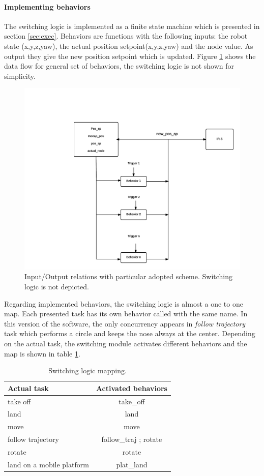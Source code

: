 \paragraph{Implementing behaviors} The switching logic is implemented as a finite state machine which is presented in section \ref{sec:exec}. Behaviors are functions with the following inputs: the robot state (x,y,z,yaw), the actual position setpoint(x,y,z,yaw) and the node value. As output they give the new position setpoint which is updated. Figure \ref{figure:flow} shows the data flow for general set of behaviors, the switching logic is not shown for simplicity. 
\begin{figure}[h]
\centering
 \includegraphics[width=\textwidth]{behav_flow.png}
 \caption[Behavior data flow]{Input/Output relations with particular adopted scheme. Switching logic is not depicted.}
 \label{figure:flow}
\end{figure}
Regarding implemented behaviors, the switching logic is almost a one to one map. Each presented task has its own behavior called with the same name. In this version of the software, the only concurrency appears in \textit{follow trajectory} task which performs a circle and keeps the nose always at the center. Depending on the actual task, the switching module activates different behaviors and the map is shown in table \ref{tab:map}.
\begin{table}[h]
\centering
\begin{tabular}{l|c}
Actual task               & Activated behaviors   \\ \hline
take off                  & take\_off             \\
land                      & land                  \\
move                      & move                  \\
follow trajectory         & follow\_traj ; rotate \\
rotate                    & rotate                \\
land on a mobile platform & plat\_land           
\end{tabular}
\caption{Switching logic mapping.}
\label{tab:map}
\end{table}

